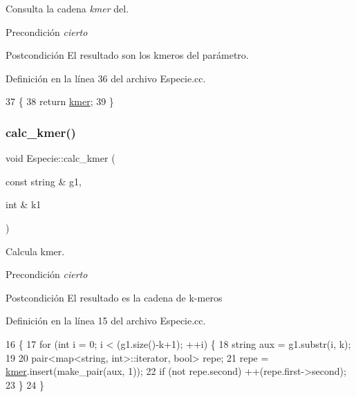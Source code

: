 Consulta la cadena {\itshape kmer} del. 

\begin{DoxyPrecond}{Precondición}
{\itshape cierto} 
\end{DoxyPrecond}
\begin{DoxyPostcond}{Postcondición}
El resultado son los kmeros del parámetro. 
\end{DoxyPostcond}


Definición en la línea 36 del archivo Especie.\+cc.


\begin{DoxyCode}
37 \{
38     \textcolor{keywordflow}{return} \hyperlink{class_especie_ab6740db160f2d7335a98fa8d9f745cbe}{kmer};
39 \}
\end{DoxyCode}
\mbox{\label{class_especie_afbfd4e6e131adf6a2a83e7c495a93a2a}} 
\subsubsection{\texorpdfstring{calc\+\_\+kmer()}{calc\_kmer()}}
{\footnotesize\ttfamily void Especie\+::calc\+\_\+kmer (\begin{DoxyParamCaption}\item[{const string \&}]{g1,  }\item[{int \&}]{k1 }\end{DoxyParamCaption})}



Calcula kmer. 

\begin{DoxyPrecond}{Precondición}
{\itshape cierto} 
\end{DoxyPrecond}
\begin{DoxyPostcond}{Postcondición}
El resultado es la cadena de k-\/meros 
\end{DoxyPostcond}


Definición en la línea 15 del archivo Especie.\+cc.


\begin{DoxyCode}
16 \{
17   \textcolor{keywordflow}{for} (\textcolor{keywordtype}{int} i = 0; i < (g1.size()-k+1); ++i) \{
18     \textcolor{keywordtype}{string} aux = g1.substr(i, k);
19   
20     pair<map<string, int>::iterator, \textcolor{keywordtype}{bool}> repe;
21     repe = \hyperlink{class_especie_ab6740db160f2d7335a98fa8d9f745cbe}{kmer}.insert(make\_pair(aux, 1));
22     \textcolor{keywordflow}{if} (not repe.second) ++(repe.first->second);    
23     \}
24 \}
\end{DoxyCode}


